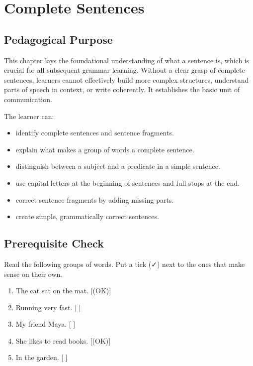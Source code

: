 
\chapter{Complete Sentences}

\section{Pedagogical Purpose}
This chapter lays the foundational understanding of what a sentence is, which is crucial for all subsequent grammar learning. Without a clear grasp of complete sentences, learners cannot effectively build more complex structures, understand parts of speech in context, or write coherently. It establishes the basic unit of communication.

\begin{learningobjectives}
The learner can:
\begin{itemize}
    \item identify complete sentences and sentence fragments.
    \item explain what makes a group of words a complete sentence.
    \item distinguish between a subject and a predicate in a simple sentence.
    \item use capital letters at the beginning of sentences and full stops at the end.
    \item correct sentence fragments by adding missing parts.
    \item create simple, grammatically correct sentences.
\end{itemize}
\end{learningobjectives}

\section{Prerequisite Check}
\begin{quickcheck}
Read the following groups of words. Put a tick (✓) next to the ones that make sense on their own.
\begin{enumerate}
    \item The cat sat on the mat. [(OK)]
    \item Running very fast. [ ]
    \item My friend Maya. [ ]
    \item She likes to read books. [(OK)]
    \item In the garden. [ ]
\end{enumerate}
\end{quickcheck}


